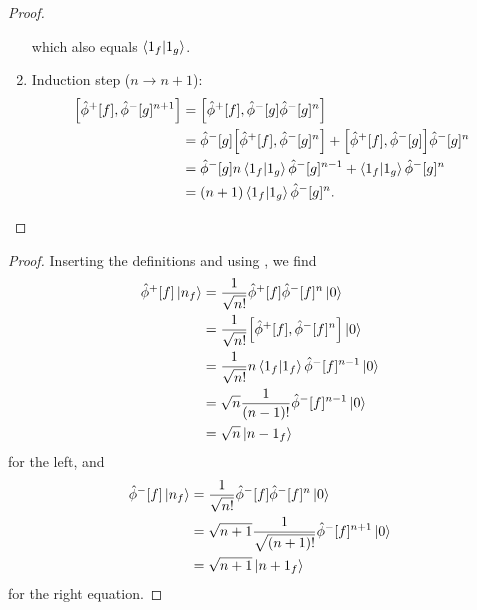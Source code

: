 \begin{proof}
\begin{enumerate}
		which also equals $\braket{1_f}{1_g}$.
		\item Induction step ($n\to n+1$):
		\begin{equation*}
			\begin{split}
				\comm{\hat\phi^+[f]}{\hat\phi^-[g]^{n+1}}
				&=
				\comm{\hat\phi^+[f]}{\hat\phi^-[g]\hat\phi^-[g]^n}
				\\
				&=
				\hat\phi^-[g]
				\comm{\hat\phi^+[f]}{\hat\phi^-[g]^n}
				+
				\comm{\hat\phi^+[f]}{\hat\phi^-[g]}
				\hat\phi^-[g]^n
				\\
				&=
				\hat\phi^-[g]
				n\braket{1_f}{1_g}
				\hat\phi^-[g]^{n-1}
				+
				\braket{1_f}{1_g}
				\hat\phi^-[g]^n
				\\
				&=
				(n+1)
				\braket{1_f}{1_g}
				\hat\phi^-[g]^n
				.
			\end{split}
		\end{equation*}
	\end{enumerate}
\end{proof}
\qkgsmearedpnladder
\begin{proof}
	Inserting the definitions and using , we find
	\begin{equation*}
		\begin{split}
			\hat\phi^+[f]
			\ket{n_f}
			&=
			\frac{1}{\sqrt{n!}}
			\hat\phi^+[f]
			\hat\phi^-[f]^n
			\ket{0}
			\\
			&=
			\frac{1}{\sqrt{n!}}
			\comm{\hat\phi^+[f]}{\hat\phi^-[f]^n}
			\ket{0}
			\\
			&=
			\frac{1}{\sqrt{n!}}
			n\braket{1_f}
			\hat\phi^-[f]^{n-1}
			\ket{0}
			\\
			&=
			\sqrt{n}
			\frac{1}{(n-1)!}
			\hat\phi^-[f]^{n-1}
			\ket{0}
			\\
			&=
			\sqrt{n}
			\ket{n-1_f}
		\end{split}
	\end{equation*}
	for the left, and
	\begin{equation*}
		\begin{split}
			\hat\phi^-[f]
			\ket{n_f}
			&=
			\frac{1}{\sqrt{n!}}
			\hat\phi^-[f]
			\hat\phi^-[f]^n
			\ket{0}
			\\
			&=
			\sqrt{n+1}
			\frac{1}{\sqrt{(n+1)!}}
			\hat\phi^-[f]^{n+1}
			\ket{0}
			\\
			&=
			\sqrt{n+1}
			\ket{n+1_f}
		\end{split}
	\end{equation*}
	for the right equation.
\end{proof}

